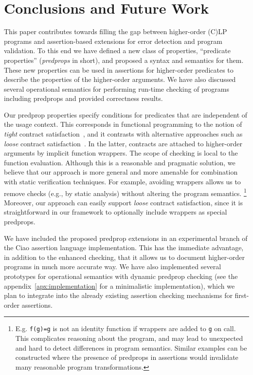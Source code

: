 \documentclass{llncs}
\begin{document}
\section{Conclusions and Future Work}

This paper contributes towards filling the gap between higher-order
(C)LP programs and assertion-based extensions for error detection and 
program validation.
To this end we have defined a new class of properties, ``predicate
properties'' (\emph{predprops} in short), and proposed a syntax and
semantics for them. These new properties can be used in assertions for
higher-order predicates to describe the properties of the higher-order
arguments.
We have also discussed several operational semantics for performing
run-time checking of programs including predprops and provided
correctness results. 

Our predprop properties specify conditions for predicates that are
independent of the usage context. This corresponds in functional
programming to the notion of \emph{tight} contract
satisfaction~\cite{DBLP:journals/toplas/DimoulasF11}, and it contrasts
with alternative approaches such as \emph{loose} contract
satisfaction~\cite{DBLP:conf/icfp/FindlerF02}.
In the latter, contracts are attached to higher-order arguments by
implicit function wrappers. The scope of checking is local to the
function evaluation. Although this is a reasonable and pragmatic
solution, we believe that our approach is more general and more
amenable for combination with static verification techniques.
For example, avoiding wrappers allows us to remove checks (e.g., by
static analysis) without altering the program semantics.
\footnote{E.g. \texttt{f(g)=g} is not an identity function if wrappers
  are added to \texttt{g} on call. This complicates reasoning about the
  program, and may lead to unexpected and hard to detect differences in
  program semantics. Similar examples can be constructed where the
  presence of predprops in assertions would invalidate many reasonable
  program transformations.}
Moreover, our approach can easily support \emph{loose} contract
satisfaction, since it is straightforward in our framework to
optionally include wrappers as special predprops.

We have included the proposed predprop extensions in an experimental
branch of the Ciao assertion language implementation. This has the
immediate advantage, in addition to the enhanced checking, that it
allows us to document higher-order programs in much more accurate way.
We have also implemented several prototypes for operational semantics
with dynamic predprop checking (see the
appendix~\ref{apx:implementation} for a minimalistic implementation),
which we plan to integrate into the already existing assertion
checking mechanisms for first-order assertions.
\end{document}

